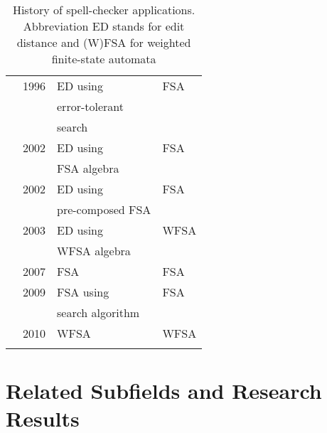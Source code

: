 \documentclass[officiallayout,final]{unihelcompling}
\begin{document}
\begin{longtable}[ht]{|l|r|l|l|}
        \hline
      \citep{oflazer1996errortolerant} & 1996 & ED using & FSA \\
                                       &      & error-tolerant & \\
                                       &      & search & \\
\citep{agata2002typographical} & 2002 & ED using & FSA \\
                               &      & FSA algebra &  \\
      \citep{schulz2002fast} & 2002 & ED using         & FSA  \\
                             &      & pre-composed FSA & \\
        \citep{mohri2003edit} & 2003 & ED using & WFSA \\
                              &      & WFSA algebra &  \\
    \citep{otero2007contextual} & 2007 & FSA & FSA  \\
      \citep{hulden2009fast} & 2009 & FSA using & FSA \\
                                &   & search algorithm & \\
\citep{pirinen2010finitestate} & 2010 & WFSA & WFSA \\
        \hline
    \caption{History of spell-checker applications. Abbreviation ED stands for
    edit distance and (W)FSA for weighted finite-state automata
    \label{table:history-apps}}
\end{longtable}

\section{Related Subfields and Research Results}
\label{sec:related}
\end{document}
